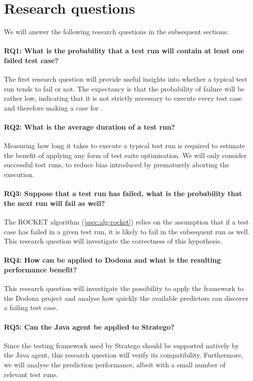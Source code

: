 
\section{Research questions}
We will answer the following research questions in the subsequent sections:

\paragraph*{RQ1: What is the probability that a test run will contain at least one failed test case?}
The first research question will provide useful insights into whether a typical test run tends to fail or not. The expectancy is that the probability of failure will be rather low, indicating that it is not strictly necessary to execute every test case and therefore making a case for \tsm{}.

\paragraph*{RQ2: What is the average duration of a test run?}
Measuring how long it takes to execute a typical test run is required to estimate the benefit of applying any form of test suite optimisation. We will only consider successful test runs, to reduce bias introduced by prematurely aborting the execution.

\paragraph*{RQ3: Suppose that a test run has failed, what is the probability that the next run will fail as well?}
The ROCKET algorithm (\cref{ssec:alg-rocket}) relies on the assumption that if a test case has failed in a given test run, it is likely to fail in the subsequent run as well. This research question will investigate the correctness of this hypothesis.

\paragraph*{RQ4: How can \tcp{} be applied to Dodona and what is the resulting performance benefit?}
This research question will investigate the possibility to apply the \velocity{} framework to the Dodona project and analyse how quickly the available predictors can discover a failing test case.

\paragraph*{RQ5: Can the Java agent be applied to Stratego?}
Since the testing framework used by Stratego should be supported natively by the Java agent, this research question will verify its compatibility. Furthermore, we will analyse the prediction performance, albeit with a small number of relevant test runs.
